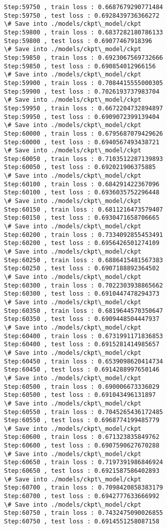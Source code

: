 \documentclass[11pt]{article}
\begin{document}
\begin{Verbatim}[commandchars=\\\{\}]
Step:59750 , train loss : 0.6687679290771484
Step:59750 , test loss : 0.6928439736366272
\# Save into ./models/ckpt\_model/ckpt
Step:59800 , train loss : 0.6837282180786133
Step:59800 , test loss : 0.69077467918396
\# Save into ./models/ckpt\_model/ckpt
Step:59850 , train loss : 0.6923067569732666
Step:59850 , test loss : 0.690854012966156
\# Save into ./models/ckpt\_model/ckpt
Step:59900 , train loss : 0.7084415555000305
Step:59900 , test loss : 0.7026193737983704
\# Save into ./models/ckpt\_model/ckpt
Step:59950 , train loss : 0.6672204732894897
Step:59950 , test loss : 0.6909072399139404
\# Save into ./models/ckpt\_model/ckpt
Step:60000 , train loss : 0.6795687079429626
Step:60000 , test loss : 0.6940567493438721
\# Save into ./models/ckpt\_model/ckpt
Step:60050 , train loss : 0.7103512287139893
Step:60050 , test loss : 0.692021906375885
\# Save into ./models/ckpt\_model/ckpt
Step:60100 , train loss : 0.684291422367096
Step:60100 , test loss : 0.6936035752296448
\# Save into ./models/ckpt\_model/ckpt
Step:60150 , train loss : 0.6811216473579407
Step:60150 , test loss : 0.6930471658706665
\# Save into ./models/ckpt\_model/ckpt
Step:60200 , train loss : 0.7334092855453491
Step:60200 , test loss : 0.6956426501274109
\# Save into ./models/ckpt\_model/ckpt
Step:60250 , train loss : 0.6886415481567383
Step:60250 , test loss : 0.6907188892364502
\# Save into ./models/ckpt\_model/ckpt
Step:60300 , train loss : 0.7022303938865662
Step:60300 , test loss : 0.6910447478294373
\# Save into ./models/ckpt\_model/ckpt
Step:60350 , train loss : 0.6819644570350647
Step:60350 , test loss : 0.6909448504447937
\# Save into ./models/ckpt\_model/ckpt
Step:60400 , train loss : 0.6731991171836853
Step:60400 , test loss : 0.6915281414985657
\# Save into ./models/ckpt\_model/ckpt
Step:60450 , train loss : 0.6539098620414734
Step:60450 , test loss : 0.6914288997650146
\# Save into ./models/ckpt\_model/ckpt
Step:60500 , train loss : 0.690006673336029
Step:60500 , test loss : 0.691043496131897
\# Save into ./models/ckpt\_model/ckpt
Step:60550 , train loss : 0.7045265436172485
Step:60550 , test loss : 0.6968774199485779
\# Save into ./models/ckpt\_model/ckpt
Step:60600 , train loss : 0.671323835849762
Step:60600 , test loss : 0.6907590627670288
\# Save into ./models/ckpt\_model/ckpt
Step:60650 , train loss : 0.7197391986846924
Step:60650 , test loss : 0.6921587586402893
\# Save into ./models/ckpt\_model/ckpt
Step:60700 , train loss : 0.7098420858383179
Step:60700 , test loss : 0.6942777633666992
\# Save into ./models/ckpt\_model/ckpt
Step:60750 , train loss : 0.7432475090026855
Step:60750 , test loss : 0.6914551258087158

\end{Verbatim}
\end{document}
